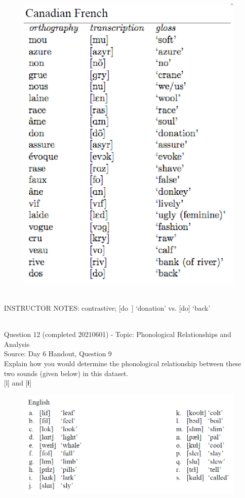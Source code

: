 \documentclass[12pt]{article}
\begin{document}
\begin{figure}[H]
\includegraphics{../images/canadianfrench.png}
\end{figure}

~\\
INSTRUCTOR NOTES: contrastive; [do~] ‘donation’ vs. [do] ‘back’


~\\

{\large Question 12} (completed 20210601) - Topic: Phonological Relationships and Analysis\\
Source: Day 6 Handout, Question 9\\

Explain how you would determine the phonological relationship between these two sounds (given below) in this dataset.\\

{[l]} and {[ɫ]}

\begin{figure}[H]
\includegraphics{../images/english_laterals.png}
\end{figure}
\end{document}
